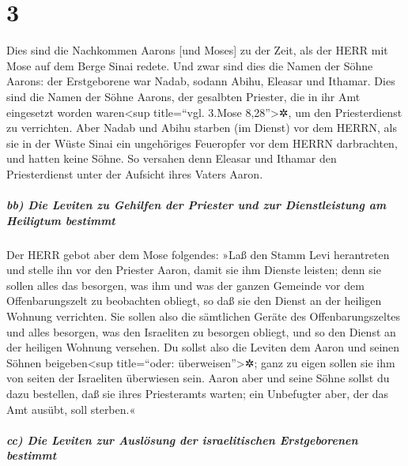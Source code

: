 \hypertarget{section-2}{%
\section{3}\label{section-2}}

Dies sind die Nachkommen Aarons {[}und Moses{]} zu der
Zeit, als der HERR mit Mose auf dem Berge Sinai redete.
Und zwar sind dies die Namen der Söhne Aarons: der
Erstgeborene war Nadab, sodann Abihu, Eleasar und Ithamar.
Dies sind die Namen der Söhne Aarons, der gesalbten
Priester, die in ihr Amt eingesetzt worden waren\textless sup
title=``vgl. 3.Mose 8,28''\textgreater✲, um den Priesterdienst zu
verrichten. Aber Nadab und Abihu starben (im Dienst) vor
dem HERRN, als sie in der Wüste Sinai ein ungehöriges Feueropfer vor dem
HERRN darbrachten, und hatten keine Söhne. So versahen denn Eleasar und
Ithamar den Priesterdienst unter der Aufsicht ihres Vaters Aaron.

\hypertarget{bb-die-leviten-zu-gehilfen-der-priester-und-zur-dienstleistung-am-heiligtum-bestimmt}{%
\subparagraph{bb) Die Leviten zu Gehilfen der Priester und zur
Dienstleistung am Heiligtum
bestimmt}\label{bb-die-leviten-zu-gehilfen-der-priester-und-zur-dienstleistung-am-heiligtum-bestimmt}}

Der HERR gebot aber dem Mose folgendes: »Laß
den Stamm Levi herantreten und stelle ihn vor den Priester Aaron, damit
sie ihm Dienste leisten; denn sie sollen alles das
besorgen, was ihm und was der ganzen Gemeinde vor dem Offenbarungszelt
zu beobachten obliegt, so daß sie den Dienst an der heiligen Wohnung
verrichten. Sie sollen also die sämtlichen Geräte des
Offenbarungszeltes und alles besorgen, was den Israeliten zu besorgen
obliegt, und so den Dienst an der heiligen Wohnung versehen.
Du sollst also die Leviten dem Aaron und seinen Söhnen
beigeben\textless sup title=``oder: überweisen''\textgreater✲; ganz zu
eigen sollen sie ihm von seiten der Israeliten überwiesen sein.
Aaron aber und seine Söhne sollst du dazu bestellen, daß
sie ihres Priesteramts warten; ein Unbefugter aber, der das Amt ausübt,
soll sterben.«

\hypertarget{cc-die-leviten-zur-ausluxf6sung-der-israelitischen-erstgeborenen-bestimmt}{%
\subparagraph{cc) Die Leviten zur Auslösung der israelitischen
Erstgeborenen
bestimmt}\label{cc-die-leviten-zur-ausluxf6sung-der-israelitischen-erstgeborenen-bestimmt}}

